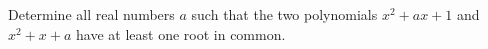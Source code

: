 Determine all real numbers $a$ such that the two polynomials $x^2+ax+1$ and $x^2+x+a$ have at least one root in common.